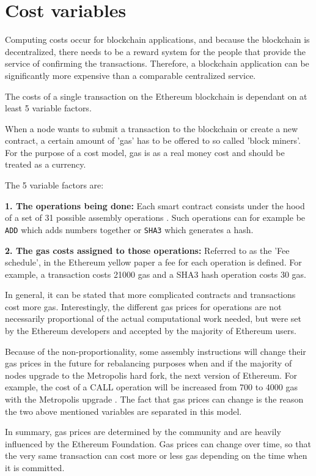 \section{Cost variables}
Computing costs occur for blockchain applications, and because the blockchain is decentralized, there needs to be a reward system for the people that provide the service of confirming the transactions.
Therefore, a blockchain application can be significantly more expensive than a comparable centralized service.

The costs of a single transaction on the Ethereum blockchain is dependant on at least 5 variable factors. 

When a node wants to submit a transaction to the blockchain or create a new contract, a certain amount of {'}gas{'} has to be offered to so called {'}block miners{'}. For the purpose of a cost model, gas is as a real money cost and should be treated as a currency.

The 5 variable factors are:

\textbf{1. The operations being done:} Each smart contract consists under the hood of a set of 31 possible assembly operations \cite{YellowPaper}. Such operations can for example be \texttt{ADD} which adds numbers together or \texttt{SHA3} which generates a hash.

\par
\textbf{2. The gas costs assigned to those operations:} Referred to as the 'Fee schedule', in the Ethereum yellow paper \cite{YellowPaper} a fee for each operation is defined. For example, a transaction costs 21000 gas and a SHA3 hash operation costs 30 gas.

In general, it can be stated that more complicated contracts and transactions cost more gas. Interestingly, the different gas prices for operations are not necessarily proportional of the actual computational work needed, but were set by the Ethereum developers and accepted by the majority of Ethereum users.

Because of the non-proportionality, some assembly instructions will change their gas prices in the future for rebalancing purposes when and if the majority of nodes upgrade to the Metropolis hard fork, the next version of Ethereum. For example, the cost of a CALL operation will be increased from 700 to 4000 gas with the Metropolis upgrade \cite{EIP150}.
The fact that gas prices can change is the reason the two above mentioned variables are separated in this model.

In summary, gas prices are determined by the community and are heavily influenced by the Ethereum Foundation. Gas prices can change over time, so that the very same transaction can cost more or less gas depending on the time when it is committed.

